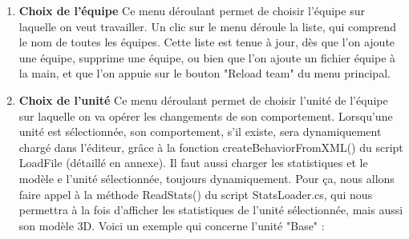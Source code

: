 \documentclass{report}
\begin{document}
\begin{enumerate}[label=\Alph*)]
\item\textbf{Choix de l'équipe} \newline
Ce menu déroulant permet de choisir l'équipe sur laquelle on veut travailler. Un clic sur le menu déroule la liste, qui comprend le nom de toutes les équipes.
Cette liste est tenue à jour, dès que l'on ajoute une équipe, supprime une équipe, ou bien que l'on ajoute un fichier équipe à la main, et que l'on appuie sur le bouton "Reload team" du menu principal.
\item\textbf{Choix de l'unité} \newline
Ce menu déroulant permet de choisir l'unité de l'équipe sur laquelle on va opérer les changements de son comportement.
Lorsqu'une unité est sélectionnée, son comportement, s'il existe, sera dynamiquement chargé dans l'éditeur, grâce à la fonction createBehaviorFromXML() du script LoadFile (détaillé en annexe).\newline
Il faut aussi charger les statistiques et le modèle e l'unité sélectionnée, toujours dynamiquement. Pour ça, nous allons faire appel à la méthode ReadStats() du script StatsLoader.cs, qui nous permettra à la fois d'afficher les statistiques de l'unité sélectionnée, mais aussi son modèle 3D.
Voici un exemple qui concerne l'unité "Base" :


\end{enumerate}
\end{document}
